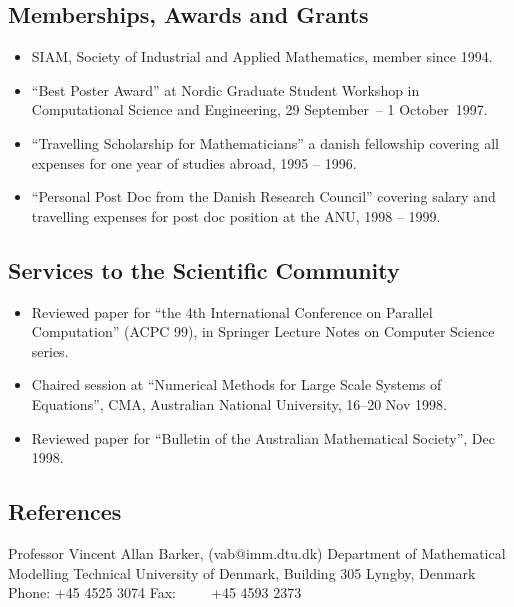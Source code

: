 \documentclass[12pt,a4paper]{article}
\begin{document}
\subsection*{Memberships, Awards and Grants}

\begin{itemize}
\item  SIAM, Society of Industrial and Applied Mathematics, member since
1994.

\item  ``Best Poster Award'' at Nordic Graduate Student Workshop in
Computational Science and Engineering, 29 September\ -- 1 October\ 1997.

\item  ``Travelling Scholarship for Mathematicians'' a danish fellowship
covering all expenses for one year of studies abroad, 1995 -- 1996.

\item  ``Personal Post Doc from the Danish Research Council'' covering
       salary and travelling expenses for post doc position at the ANU, 
       1998 -- 1999.  
\end{itemize}

\subsection*{Services to the Scientific Community}

\begin{itemize} 
  \item Reviewed paper for ``the 4th International Conference on Parallel
  Computation'' (ACPC 99), in Springer Lecture Notes on Computer Science series.
  
  \item Chaired session at ``Numerical Methods for Large Scale Systems of Equations'', CMA, Australian National University, 16--20 Nov 1998.
  
  \item Reviewed paper for ``Bulletin of the Australian Mathematical Society'',
  Dec 1998. 
\end{itemize}


\newpage
\subsection*{References}

\noindent Professor Vincent Allan Barker, (vab@imm.dtu.dk)\newline
Department of Mathematical Modelling \newline
Technical University of Denmark, Building 305  Lyngby, Denmark \newline
Phone: +45 4525 3074 \newline
Fax:\ \ \ \ \  +45 4593 2373\newline
\end{document}
